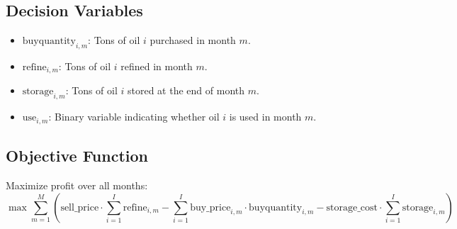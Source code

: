 \documentclass{article}
\begin{document}
\subsection*{Decision Variables}
\begin{itemize}
    \item \( \text{buyquantity}_{i,m} \): Tons of oil \( i \) purchased in month \( m \).
    \item \( \text{refine}_{i,m} \): Tons of oil \( i \) refined in month \( m \).
    \item \( \text{storage}_{i,m} \): Tons of oil \( i \) stored at the end of month \( m \).
    \item \( \text{use}_{i,m} \): Binary variable indicating whether oil \( i \) is used in month \( m \).
\end{itemize}

\subsection*{Objective Function}
Maximize profit over all months:
\[
\max \sum_{m=1}^{M} \left( \text{sell\_price} \cdot \sum_{i=1}^{I} \text{refine}_{i,m} - \sum_{i=1}^{I} \text{buy\_price}_{i,m} \cdot \text{buyquantity}_{i,m} - \text{storage\_cost} \cdot \sum_{i=1}^{I} \text{storage}_{i,m} \right)
\]
\end{document}
